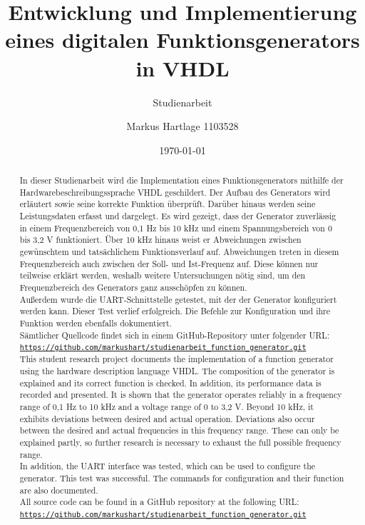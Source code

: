 \documentclass[BCOR=1cm, twoside, ngerman]{scrreprt}
\title{Entwicklung und Implementierung eines digitalen Funktionsgenerators in VHDL}
\subtitle{Studienarbeit}
\author{Markus Hartlage 1103528}
\date{\today} %
\newcommand{\code}[1]{\texttt{#1}}
\begin{document}
\maketitle

\begin{abstract}
  In dieser Studienarbeit wird die Implementation eines Funktionsgenerators mithilfe der Hardwarebeschreibungssprache VHDL geschildert.
  Der Aufbau des Generators wird erläutert sowie seine korrekte Funktion überprüft.
  Darüber hinaus werden seine Leistungsdaten erfasst und dargelegt.
  Es wird gezeigt, dass der Generator zuverlässig in einem Frequenzbereich von 0,1 Hz bis 10 kHz und einem Spannungsbereich von 0 bis 3,2 V funktioniert.
  Über 10 kHz hinaus weist er Abweichungen zwischen gewünschtem und tatsächlichem Funktionsverlauf auf.
  Abweichungen treten in diesem Frequenzbereich auch zwischen der Soll- und Ist-Frequenz auf.
  Diese können nur teilweise erklärt werden, weshalb weitere Untersuchungen nötig sind, um den Frequenzbereich des Generators ganz ausschöpfen zu können. \\
  Außerdem wurde die UART-Schnittstelle getestet, mit der der Generator konfiguriert werden kann.
  Dieser Test verlief erfolgreich. Die Befehle zur Konfiguration und ihre Funktion werden ebenfalls dokumentiert. \\
  Sämtlicher Quellcode findet sich in einem GitHub-Repository unter folgender URL: \\
  \href{https://github.com/markushart/studienarbeit_function_generator.git}{\code{https://github.com/markushart/studienarbeit\_function\_generator.git}}
  \\

  This student research project documents the implementation of a function generator using the hardware description language VHDL.
  The composition of the generator is explained and its correct function is checked.
  In addition, its performance data is recorded and presented.
  It is shown that the generator operates reliably in a frequency range of 0,1 Hz to 10 kHz and a voltage range of 0 to 3,2 V.
  Beyond 10 kHz, it exhibits deviations between desired and actual operation.
  Deviations also occur between the desired and actual frequencies in this frequency range.
  These can only be explained partly, so further research is necessary to exhaust the full possible frequency range. \\
  In addition, the UART interface was tested, which can be used to configure the generator.
  This test was successful. The commands for configuration and their function are also documented. \\
  All source code can be found in a GitHub repository at the following URL: \\
  \href{https://github.com/markushart/studienarbeit_function_generator.git}{\code{https://github.com/markushart/studienarbeit\_function\_generator.git}}
  \\

\end{abstract}
\end{document}
